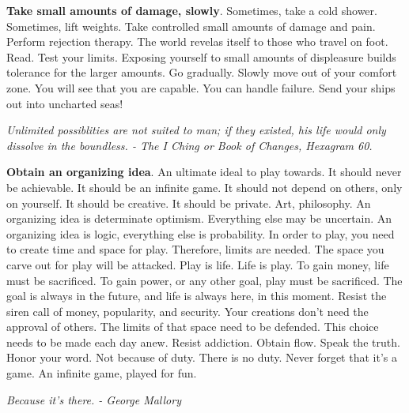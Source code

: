 \documentclass[a4paper,hidelinks]{article}
\begin{document}
\textbf{Take small amounts of damage, slowly}.
Sometimes, take a cold shower.
Sometimes, lift weights.
Take controlled small amounts of damage and pain.
Perform rejection therapy.
The world revelas itself to those who travel on foot.
Read.
Test your limits.
Exposing yourself to small amounts of displeasure builds tolerance for the larger amounts.
Go gradually.
Slowly move out of your comfort zone.
You will see that you are capable.
You can handle failure.
Send your ships out into uncharted seas!

\newpage

\begin{center}
\textit{Unlimited possiblities are not suited to man; if they existed, his life would only dissolve in the boundless. - The I Ching or Book of Changes, Hexagram 60.}
\end{center}

\textbf{Obtain an organizing idea}.
An ultimate ideal to play towards.
It should never be achievable.
It should be an infinite game.
It should not depend on others, only on yourself.
It should be creative.
It should be private.
Art, philosophy.
An organizing idea is determinate optimism.
Everything else may be uncertain.
An organizing idea is logic, everything else is probability.
In order to play, you need to create time and space for play.
Therefore, limits are needed.
The space you carve out for play will be attacked.
Play is life.
Life is play.
To gain money, life must be sacrificed.
To gain power, or any other goal, play must be sacrificed.
The goal is always in the future, and life is always here, in this moment.
Resist the siren call of money, popularity, and security.
Your creations don't need the approval of others.
The limits of that space need to be defended.
This choice needs to be made each day anew.
Resist addiction.
Obtain flow.
Speak the truth.
Honor your word.
Not because of duty.
There is no duty.
Never forget that it's a game.
An infinite game, played for fun.

\newpage

\begin{center}
\textit{
Because it's there. - George Mallory
}
\end{center}
\end{document}
